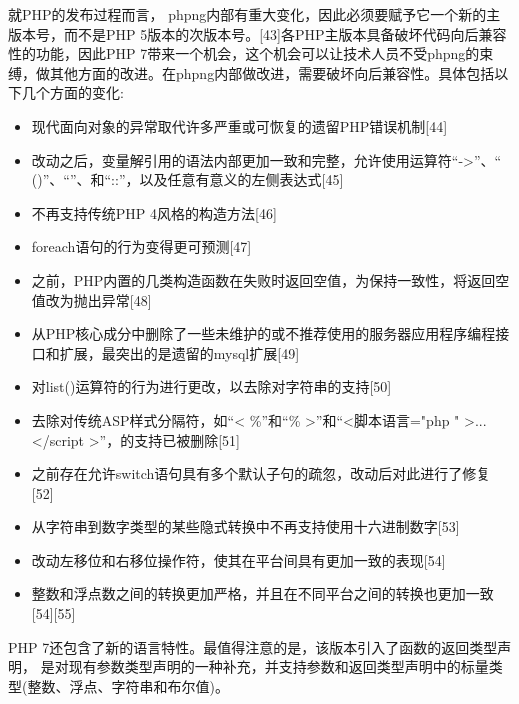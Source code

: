 就PHP的发布过程而言， phpng内部有重大变化，因此必须要赋予它一个新的主版本号，而不是PHP 5版本的次版本号。[43]各PHP主版本具备破坏代码向后兼容性的功能，因此PHP 7带来一个机会，这个机会可以让技术人员不受phpng的束缚，做其他方面的改进。在phpng内部做改进，需要破坏向后兼容性。具体包括以下几个方面的变化:
\begin{itemize}
\item 现代面向对象的异常取代许多严重或可恢复的遗留PHP错误机制[44]
\item 改动之后，变量解引用的语法内部更加一致和完整，允许使用运算符“->”、“ ()”、“{}”、和“::”，以及任意有意义的左侧表达式[45]
\item 不再支持传统PHP 4风格的构造方法[46]
\item foreach语句的行为变得更可预测[47]
\item 之前，PHP内置的几类构造函数在失败时返回空值，为保持一致性，将返回空值改为抛出异常[48]
\item 从PHP核心成分中删除了一些未维护的或不推荐使用的服务器应用程序编程接口和扩展，最突出的是遗留的mysql扩展[49]
\item 对list()运算符的行为进行更改，以去除对字符串的支持[50]
\item 去除对传统ASP样式分隔符，如“< \%”和“\% >”和“<脚本语言="php " >...</script >”，的支持已被删除[51]
\item 之前存在允许switch语句具有多个默认子句的疏忽，改动后对此进行了修复[52]
\item 从字符串到数字类型的某些隐式转换中不再支持使用十六进制数字[53]
\item 改动左移位和右移位操作符，使其在平台间具有更加一致的表现[54]
\item 整数和浮点数之间的转换更加严格，并且在不同平台之间的转换也更加一致[54][55]
\end{itemize}
PHP 7还包含了新的语言特性。最值得注意的是，该版本引入了函数的返回类型声明， 是对现有参数类型声明的一种补充，并支持参数和返回类型声明中的标量类型(整数、浮点、字符串和布尔值)。

